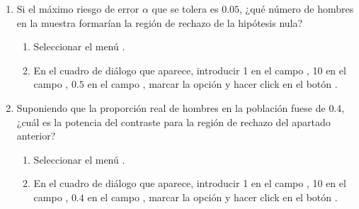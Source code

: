 \begin{enumerate}[leftmargin=*]
\begin{enumerate}
\item Si el máximo riesgo de error $\alpha$ que se tolera es $0.05$, ¿qué número de hombres en la muestra formarían la
región de rechazo de la hipótesis nula?
\begin{indicacion}
\begin{enumerate}
\item Seleccionar el menú .
\item En el cuadro de diálogo que aparece, introducir 1 en el campo , 10 en el campo
, $0.5$ en el campo , marcar la opción  y
hacer click en el botón .
\end{enumerate}
\end{indicacion}

\item Suponiendo que la proporción real de hombres en la población fuese de $0.4$, ¿cuál es la potencia del contraste
para la región de rechazo del apartado anterior?
\begin{indicacion}
\begin{enumerate}
\item Seleccionar el menú .
\item En el cuadro de diálogo que aparece, introducir 1 en el campo , 10 en el campo
, $0.4$ en el campo , marcar la opción  y
hacer click en el botón .
\end{enumerate}
\end{indicacion}


\end{enumerate}
\end{enumerate}
